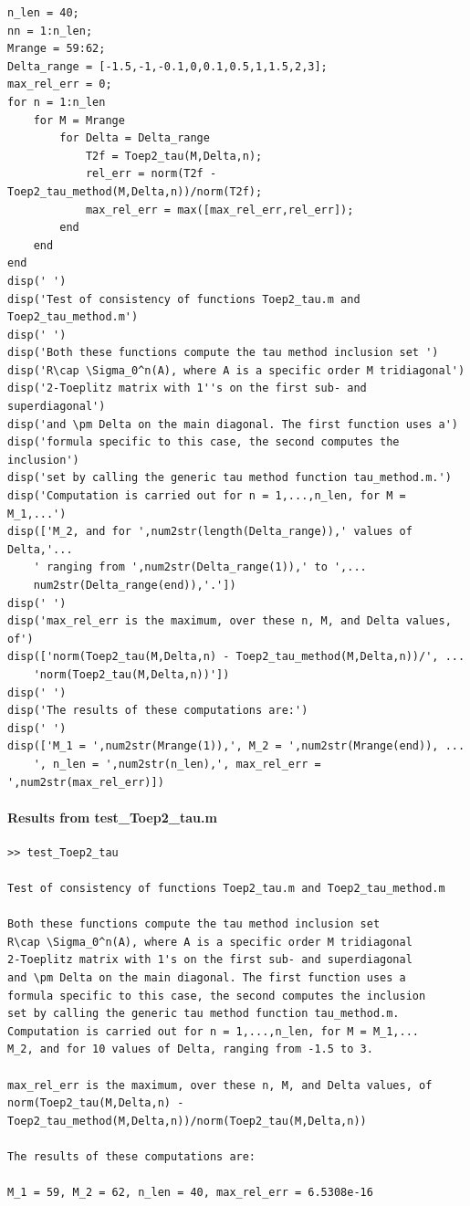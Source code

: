 \documentclass[preprint,1p,11pt]{elsarticle}
\numberwithin{equation}{section}   %
\numberwithin{figure}{section}  %
\begin{document}
\begin{verbatim}
n_len = 40;
nn = 1:n_len;
Mrange = 59:62;
Delta_range = [-1.5,-1,-0.1,0,0.1,0.5,1,1.5,2,3];
max_rel_err = 0;
for n = 1:n_len
    for M = Mrange
        for Delta = Delta_range
            T2f = Toep2_tau(M,Delta,n);
            rel_err = norm(T2f -Toep2_tau_method(M,Delta,n))/norm(T2f);
            max_rel_err = max([max_rel_err,rel_err]);
        end
    end
end
disp(' ')
disp('Test of consistency of functions Toep2_tau.m and Toep2_tau_method.m')
disp(' ')
disp('Both these functions compute the tau method inclusion set ')
disp('R\cap \Sigma_0^n(A), where A is a specific order M tridiagonal')
disp('2-Toeplitz matrix with 1''s on the first sub- and superdiagonal')
disp('and \pm Delta on the main diagonal. The first function uses a')
disp('formula specific to this case, the second computes the inclusion')
disp('set by calling the generic tau method function tau_method.m.') 
disp('Computation is carried out for n = 1,...,n_len, for M = M_1,...')
disp(['M_2, and for ',num2str(length(Delta_range)),' values of Delta,'...
    ' ranging from ',num2str(Delta_range(1)),' to ',...
    num2str(Delta_range(end)),'.'])
disp(' ')
disp('max_rel_err is the maximum, over these n, M, and Delta values, of')
disp(['norm(Toep2_tau(M,Delta,n) - Toep2_tau_method(M,Delta,n))/', ...
    'norm(Toep2_tau(M,Delta,n))'])
disp(' ')
disp('The results of these computations are:')
disp(' ')
disp(['M_1 = ',num2str(Mrange(1)),', M_2 = ',num2str(Mrange(end)), ...
    ', n_len = ',num2str(n_len),', max_rel_err = ',num2str(max_rel_err)])
\end{verbatim}

\paragraph{Results from test\_Toep2\_tau.m}

\begin{verbatim}
>> test_Toep2_tau
 
Test of consistency of functions Toep2_tau.m and Toep2_tau_method.m
 
Both these functions compute the tau method inclusion set 
R\cap \Sigma_0^n(A), where A is a specific order M tridiagonal
2-Toeplitz matrix with 1's on the first sub- and superdiagonal
and \pm Delta on the main diagonal. The first function uses a
formula specific to this case, the second computes the inclusion
set by calling the generic tau method function tau_method.m.
Computation is carried out for n = 1,...,n_len, for M = M_1,...
M_2, and for 10 values of Delta, ranging from -1.5 to 3.
 
max_rel_err is the maximum, over these n, M, and Delta values, of
norm(Toep2_tau(M,Delta,n) - Toep2_tau_method(M,Delta,n))/norm(Toep2_tau(M,Delta,n))
 
The results of these computations are:
 
M_1 = 59, M_2 = 62, n_len = 40, max_rel_err = 6.5308e-16
\end{verbatim}
\end{document}
